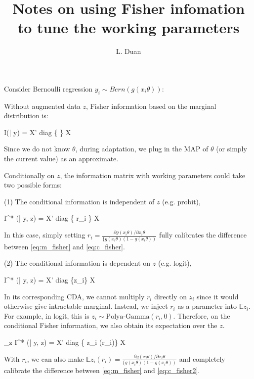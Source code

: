 \documentclass[11pt]{amsart}
\numberwithin{equation}{section}
\theoremstyle{plain}
\theoremstyle{definition}
\newcommand{\bb}[1]{\mathbb{#1}}
\newcommand{\be}{\begin{equs}}
\newcommand{\ee}{\end{equs}}
\begin{document}
\title{Notes on using Fisher infomation to tune the working parameters}
\author{L. Duan}
\maketitle

Consider Bernoulli regression $y_i\sim Bern ( g(x_i\theta))$:

Without augmented data $z$, Fisher information based on the marginal distribution is:

\be
I(\theta| y) =  X' diag \left \{  \right \} X
\label{eq:m_fisher}
\ee

Since we do not know $\theta$, during adaptation, we plug in the MAP of $\theta$ (or simply the current value) as an approximate.

Conditionally on $z$, the information matrix with working parameters could take two possible forms:

(1) The conditional information is independent of $z$ (e.g. probit),
\be
I^* (\theta| y, z) =  X' diag \left \{  r_i \right \} X
\label{eq:c_fisher}
\ee

In this case, simply setting $r_i= \frac{{\partial g(x_i\theta)}/{\partial x_i \theta}}{   \{g(x_i\theta) (1-g(x_i\theta)) }$ fully calibrates the difference between \eqref{eq:m_fisher} and \eqref{eq:c_fisher}.

(2)  The conditional information is dependent on $z$ (e.g. logit),

\be
I^* (\theta| y, z) =  X' diag \{z_i\} X
\ee

In its corresponding CDA, we cannot multiply $r_i$ directly on $z_i$ since it would otherwise give intractable marginal. Instead, we inject $r_i$ as a parameter into $\bb E z_i$. For example, in logit, this is $z_i \sim \text{Polya-Gamma}(r_i, 0)$. Therefore, on the conditional Fisher information, we also obtain its expectation over the $z$.


\be
\bb E_z I^* (\theta| y, z) =  X' diag \{ \bb E z_i (r_i)\} X
\label{eq:c_fisher2}
\ee

With $r_i$, we can also make $ \bb E z_i (r_i) = \frac{{\partial g(x_i\theta)}/{\partial x_i \theta}}{   \{g(x_i\theta) (1-g(x_i\theta)) }$ and completely calibrate the difference between \eqref{eq:m_fisher} and \eqref{eq:c_fisher2}.
\end{document}
